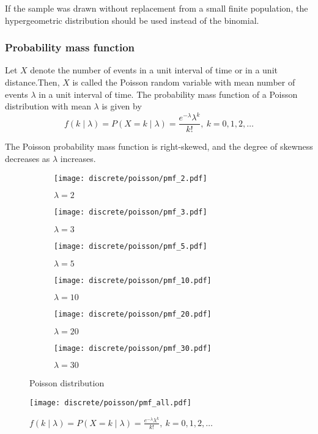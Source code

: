 If the sample was drawn without replacement from a small finite population, the hypergeometric distribution should be used instead of the binomial.

\subsubsection{Probability mass function}
Let $X$ denote the number of events in a unit interval of time or in a unit distance.Then, $X$ is called the Poisson random variable with mean number of events $\lambda$ in a unit interval of time. The probability mass function of a Poisson distribution with mean $\lambda$ is given by
\[
 	f(k \mid \lambda) = P(X = k \mid \lambda) = \frac{e^{-\lambda} \lambda^k}{k!}, \ k = 0, 1, 2, \ldots
\]

The Poisson probability mass function is right-skewed, and the degree of skewness decreases as $\lambda$ increases.

\begin{figure}[H]
	\centering
	\begin{subfigure}[b]{0.45\textwidth}
		\texttt{[image: discrete/poisson/pmf\_2.pdf]}
		\caption{$\lambda = 2$}
	\end{subfigure}
	\begin{subfigure}[b]{0.45\textwidth}
		\texttt{[image: discrete/poisson/pmf\_3.pdf]}
		\caption{$\lambda = 3$}
	\end{subfigure}
	\begin{subfigure}[b]{0.45\textwidth}
		\texttt{[image: discrete/poisson/pmf\_5.pdf]}
		\caption{$\lambda = 5$}
	\end{subfigure}
	\begin{subfigure}[b]{0.45\textwidth}
		\texttt{[image: discrete/poisson/pmf\_10.pdf]}
		\caption{$\lambda = 10$}
	\end{subfigure}
	\begin{subfigure}[b]{0.45\textwidth}
		\texttt{[image: discrete/poisson/pmf\_20.pdf]}
		\caption{$\lambda = 20$}
	\end{subfigure}
	\begin{subfigure}[b]{0.45\textwidth}
		\texttt{[image: discrete/poisson/pmf\_30.pdf]}
		\caption{$\lambda = 30$}
	\end{subfigure}
	\caption{Poisson distribution}
\end{figure}

\begin{figure}[H]
	\texttt{[image: discrete/poisson/pmf\_all.pdf]}
	\caption{$f(k \mid \lambda) = P(X = k \mid \lambda) = \frac{e^{-\lambda} \lambda^k}{k!}, \ k = 0, 1, 2, \ldots$}
\end{figure}

